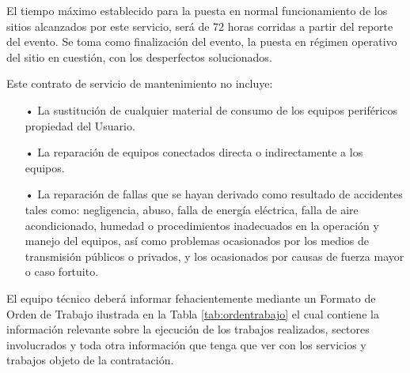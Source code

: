 El tiempo máximo establecido para la puesta en normal funcionamiento de los sitios alcanzados por este servicio, será de 72 horas corridas a partir del reporte del evento. Se toma como finalización del evento, la puesta en régimen operativo del sitio en cuestión, con los desperfectos solucionados. 

Este contrato de servicio de mantenimiento no incluye:

\begin{itemize}

\item[•]La sustitución de cualquier material de consumo de los equipos periféricos propiedad del Usuario.

\item[•]La reparación de equipos conectados directa o indirectamente a los equipos.

\item[•]La reparación de fallas que se hayan derivado como resultado de accidentes tales como: negligencia, abuso, falla de energía eléctrica, falla de aire acondicionado, humedad o procedimientos inadecuados en la operación y manejo del equipos, así como problemas ocasionados por los medios de transmisión públicos o privados, y los ocasionados por causas de fuerza mayor o caso fortuito.




\end{itemize}


El equipo técnico deberá informar fehacientemente mediante un Formato de Orden de Trabajo ilustrada en la Tabla \ref{tab:ordentrabajo} el cual contiene la información relevante sobre la ejecución de los trabajos realizados, sectores involucrados y toda otra información que tenga que ver con los servicios y trabajos objeto de la contratación.




